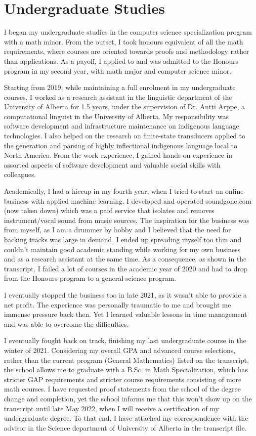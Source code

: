 \section*{Undergraduate Studies}

I began my undergraduate studies in the computer science specialization program with a math minor.
From the outset, I took honours equivalent of all the math requirements,
where courses are oriented towards proofs and methodology rather than applications.
As a payoff, I applied to and was admitted to the Honours program in my second year,
with math major and computer science minor.

Starting from 2019, while maintaining a full enrolment in my undergraduate courses,
I worked as a research assistant in the linguistic department of the University of Alberta for 1.5 years,
under the supervision of Dr. Antti Arppe, a computational linguist in the University of Alberta.
My responsibility was software development and infrastructure maintenance on indigenous language technologies.
I also helped on the research on finite-state transducers applied to
the generation and parsing of highly inflectional indigenous language local to North America.
From the work experience,
I gained hands-on experience in assorted aspects of software development and valuable social skills with colleagues.

Academically, I had a hiccup in my fourth year,
when I tried to start an online business with applied machine learning.
I developed and operated soundgone.com (now taken down) which was a paid service that isolates and removes instrument/vocal sound
from music sources.
The inspiration for the business was from myself, as I am a drummer by hobby and I believed that
the need for backing tracks was large in demand.
I ended up spreading myself too thin and couldn't maintain good academic standing
while working for my own business and as a research assistant at the same time.
As a consequence, as shown in the transcript,
I failed a lot of courses in the academic year of 2020 and had to drop from the Honours program to a general science program.

I eventually stopped the business too in late 2021, as it wasn't able to provide a net profit.
The experience was personally traumatic to me and brought me immense pressure back then.
Yet I learned valuable lessons in time management and was able to overcome the difficulties.

I eventually fought back on track,
finishing my last undergraduate course in the winter of 2021.
Considering my overall GPA and advanced course selections,
rather than the current program (General Mathematics) listed on the transcript,
the school allows me to graduate with a B.Sc. in Math Specialization,
which has stricter GAP requirements and stricter course requirements consisting of more math courses.
I have requested proof statements from the school of the degree change and completion,
yet the school informs me that this won't show up on the transcript until late May 2022,
when I will receive a certification of my undergraduate degree.
To that end, I have attached my correspondence with the advisor in the Science department of University of Alberta
in the transcript file.
